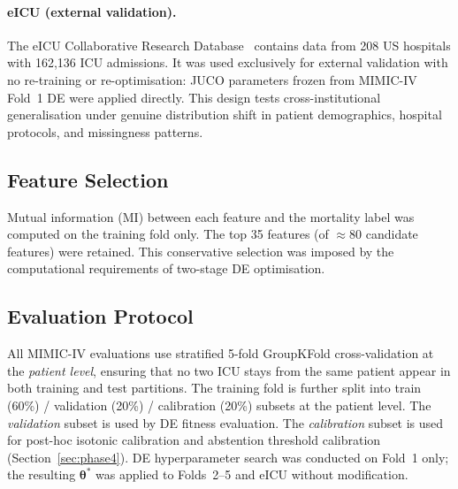 \documentclass[a4paper,fleqn,longmktitle]{cas-sc}
\begin{document}
	\paragraph{eICU (external validation).}
	The eICU Collaborative Research Database~\citep{pollard2018eicu}
	contains data from 208 US hospitals with 162{,}136
	ICU admissions.
	It was used exclusively for external validation with no re-training
	or re-optimisation: JUCO parameters frozen from MIMIC-IV Fold~1 DE
	were applied directly.
	This design tests cross-institutional generalisation under genuine
	distribution shift in patient demographics, hospital protocols,
	and missingness patterns.
	
	\subsection{Feature Selection}
	\label{sec:feature_selection}
	
	Mutual information (MI) between each feature and the mortality label
	was computed on the training fold only.
	The top 35 features (of $\approx$80 candidate features) were retained.
	This conservative selection was imposed by the computational
	requirements of two-stage DE optimisation.
	
	\subsection{Evaluation Protocol}
	\label{sec:evaluation_protocol}
	
	All MIMIC-IV evaluations use stratified 5-fold
	GroupKFold cross-validation at the \emph{patient level}, ensuring
	that no two ICU stays from the same patient appear in both training
	and test partitions.
	The training fold is further split into
	train (60\%) / validation (20\%) / calibration (20\%) subsets
	at the patient level.
	The \emph{validation} subset is used by DE fitness evaluation.
	The \emph{calibration} subset is used for post-hoc isotonic
	calibration and abstention threshold calibration (Section~\ref{sec:phase4}).
	DE hyperparameter search was conducted on Fold~1 only;
	the resulting $\boldsymbol{\theta}^*$ was applied to Folds~2--5 and
	eICU without modification.
	
\end{document}
